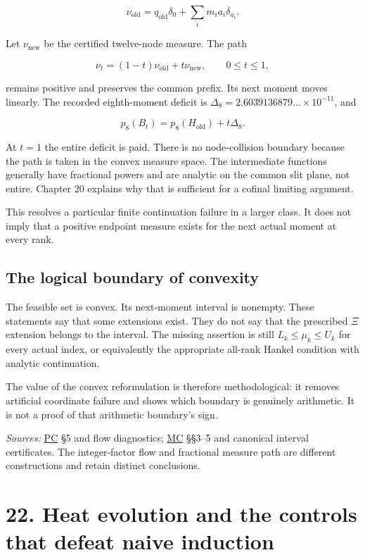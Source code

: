 \documentclass[
  10pt,
  a4paper,
  10pt,
  oneside,
  openany]{book}
\begin{document}
\[
\nu_{\mathrm{old}}=q_{\mathrm{old}}\delta_0+
\sum_i m_i a_i\delta_{a_i}.
\tag{21.13}\label{eq:21.13}
\]

Let \(\nu_{\mathrm{new}}\) be the certified twelve-node measure. The
path

\[
\nu_t=(1-t)\nu_{\mathrm{old}}+t\nu_{\mathrm{new}},
\qquad0\le t\le1,
\tag{21.14}\label{eq:21.14}
\]

remains positive and preserves the common prefix. Its next moment moves
linearly. The recorded eighth-moment deficit is
\(\Delta_8=2.6039136879\ldots\times10^{-11}\), and

\[
p_8(B_t)=p_8(H_{\mathrm{old}})+t\Delta_8.
\tag{21.15}\label{eq:21.15}
\]

At \(t=1\) the entire deficit is paid. There is no node-collision
boundary because the path is taken in the convex measure space. The
intermediate functions generally have fractional powers and are analytic
on the common slit plane, not entire. Chapter 20 explains why that is
sufficient for a cofinal limiting argument.

This resolves a particular finite continuation failure in a larger
class. It does not imply that a positive endpoint measure exists for the
next actual moment at every rank.

\subsection{The logical boundary of
convexity}\label{the-logical-boundary-of-convexity}

The feasible set is convex. Its next-moment interval is nonempty. These
statements say that some extensions exist. They do not say that the
prescribed \(\Xi\) extension belongs to the interval. The missing
assertion is still \(L_k\le\mu_k\le U_k\) for every actual index, or
equivalently the appropriate all-rank Hankel condition with analytic
continuation.

The value of the convex reformulation is therefore methodological: it
removes artificial coordinate failure and shows which boundary is
genuinely arithmetic. It is not a proof of that arithmetic boundary's
sign.

\emph{Sources:} \hyperref[source-pc]{PC} §5 and flow diagnostics;
\hyperref[source-mc]{MC} §§3--5 and canonical interval certificates. The
integer-factor flow and fractional measure path are different
constructions and retain distinct conclusions.

\section{22. Heat evolution and the controls that defeat naive
induction}\label{ch-heat-controls}
\end{document}
